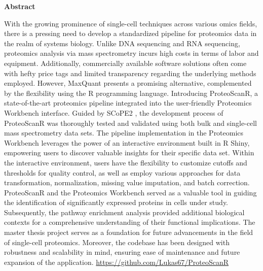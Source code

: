 \documentclass[
  11pt,
]{article}
\begin{document}
\newpage


\begin{centering}

{\bf Abstract}

\end{centering}


With the growing prominence of single-cell techniques across various
omics fields, there is a pressing need to develop a standardized
pipeline for proteomics data in the realm of systems biology. Unlike DNA
sequencing and RNA sequencing, proteomics analysis via mass spectrometry
incurs high costs in terms of labor and equipment. Additionally,
commercially available software solutions often come with hefty price
tags and limited transparency regarding the underlying methods employed.
However, MaxQuant \citep{Cox2008} presents a promising alternative,
complemented by the flexibility using the R programming language.
Introducing ProteoScanR, a state-of-the-art proteomics pipeline
integrated into the user-friendly Proteomics Workbench interface. Guided
by SCoPE2 \citep{Specht2021, Petelski2021, Vanderaa2021}, the
development process of ProteoScanR was thoroughly tested and validated
using both bulk and single-cell mass spectrometry data sets. The
pipeline implementation in the Proteomics Workbench leverages the power
of an interactive environment built in R Shiny, empowering users to
discover valuable insights for their specific data set. Within the
interactive environment, users have the flexibility to customize cutoffs
and thresholds for quality control, as well as employ various approaches
for data transformation, normalization, missing value imputation, and
batch correction. ProteoScanR and the Proteomics Workbench served as a
valuable tool in guiding the identification of significantly expressed
proteins in cells under study. Subsequently, the pathway enrichment
analysis provided additional biological contexts for a comprehensive
understanding of their functional implications. The master thesis
project serves as a foundation for future advancements in the field of
single-cell proteomics. Moreover, the codebase has been designed with
robustness and scalability in mind, ensuring ease of maintenance and
future expansion of the application.
\url{https://github.com/Lukas67/ProteoScanR}


\newpage

\centering
\raggedright
\newpage
\tableofcontents
\end{document}
